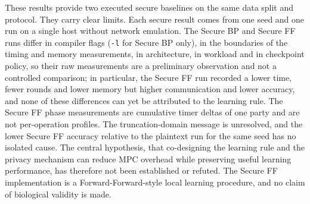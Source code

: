 These results provide two executed secure baselines on the same data split and protocol. They carry clear limits. Each secure result comes from one seed and one run on a single host without network emulation. The Secure BP and Secure FF runs differ in compiler flags (\texttt{-l} for Secure BP only), in the boundaries of the timing and memory measurements, in architecture, in workload and in checkpoint policy, so their raw measurements are a preliminary observation and not a controlled comparison; in particular, the Secure FF run recorded a lower time, fewer rounds and lower memory but higher communication and lower accuracy, and none of these differences can yet be attributed to the learning rule. The Secure FF phase measurements are cumulative timer deltas of one party and are not per-operation profiles. The truncation-domain message is unresolved, and the lower Secure FF accuracy relative to the plaintext run for the same seed has no isolated cause. The central hypothesis, that co-designing the learning rule and the privacy mechanism can reduce MPC overhead while preserving useful learning performance, has therefore not been established or refuted. The Secure FF implementation is a Forward-Forward-style local learning procedure, and no claim of biological validity is made.

